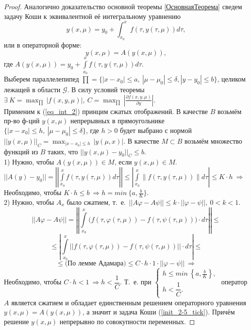 \begin{proof}
	Аналогично доказательство основной теоремы \ref{ОсновнаяТеорема} сведем задачу Коши к эквивалентной её интегральному уравнению 
	\begin{equation}\label{eq_int_1}
		y(x, \mu) = y_0 + \int_{x_0}^{x} f(\tau, y(\tau, \mu)) d\tau,
	\end{equation}
	или в операторной форме:
	\begin{equation}\label{eq_int_2}
		y(x, \mu) = A(y(x, \mu)),
	\end{equation}
	где $\displaystyle A(y(x, \mu)) = y_0 + \int\limits_{x_0}^{x} f(\tau, y(\tau, \mu)) d\tau$.\\
	Выберем параллелепипед $\prod = \{ |x - x_0| \leq a,\ |\mu - \mu_0| \leq \delta, |y - y_0| \leq b\}$, целиком лежащей в области $\mathcal{G}$. В силу условий теоремы $\displaystyle \exists\ K = \max_{\prod \ }|f(x, y, \mu)|,\ C = \max_{\prod \ } \left| \frac{\partial f(x, y, \mu)}{\partial y} \right|$.\\ 
	Применим к (\ref{eq_int_2}) принцим сжатых отображений. В качестве $B$ возьмём пр-во ф-ций $y(x, \mu)$ непрерывных в прямоугольнике $\{|x - x_0| \leq h,\ |\mu - \mu_0| \leq \delta\}$, где $h > 0$ будет выбрано с нормой $\displaystyle||y(x, \mu)||_C = \max_{|x - x_0| \leq h\ } |y (\mu, x)|$. В качестве $M \subset B$ возьмём множество функций из $B$ таких, что $||y(x, \mu) - y_0||_C \leq b$.\\
	1) Нужно, чтобы $A(y(x, \mu)) \in M$, если $y(x, \mu) \in M$. $||A(y) - y_0|| = \left|\left|\displaystyle \int\limits_{x_0}^{x} f(\tau, y(\tau, \mu)) d\tau \right|\right| \leq \displaystyle \left|\int\limits_{x_0}^{x} \| f(\tau, y(\tau, \mu)) \| d\tau\right| \leq K \cdot h\ \Rightarrow$ Необходимо, чтобы $K\cdot h \leq b\ \Rightarrow h = min\ \{a, \frac{b}{K}\}$. \\
	2) Нужно, чтобы $A_x$ было сжатием, т.\ е.\ $||A\varphi - A\psi|| \leq k \cdot ||\varphi - \psi||,\ 0 < k < 1$. \\
	$$||A\varphi - A\psi|| = \left|\left|\displaystyle\int\limits_{x_0}^{x} \Big( f(\tau, \varphi(\tau, \mu)) - f(\tau, \psi(\tau, \mu)) \Big) \cdot d\tau \right|\right| \leq $$
	$$ \leq \left|\displaystyle \int\limits_{x_0}^{x} ||f(\tau, \varphi(\tau, \mu)) - f(\tau, \psi(\tau, \mu))|| \cdot d\tau \right| \leq $$ 
	$$ \leq \text{(По лемме Адамара)} \leq C\cdot h\cdot 1\cdot ||\varphi - \psi||\ \Rightarrow$$
	Необходимо, чтобы $C\cdot h < 1\ \Rightarrow h < \dfrac{1}{C}$.
	Т.\ е. при 
	$\begin{cases} 
		h \leq min ~ \left \{a, \frac{b}{K} \right \}, \\
		h < \dfrac{1}{C}. 
	\end{cases}$
	оператор $A$ является сжатием и обладает единственным решением операторного уравнения $y(x, \mu) = A(y(x, \mu))$, а значит и задача Коши (\ref{init_2-5_tick}). Причём решение $y(x, \mu)$ непрерывно по совокупности переменных.
\end{proof}
